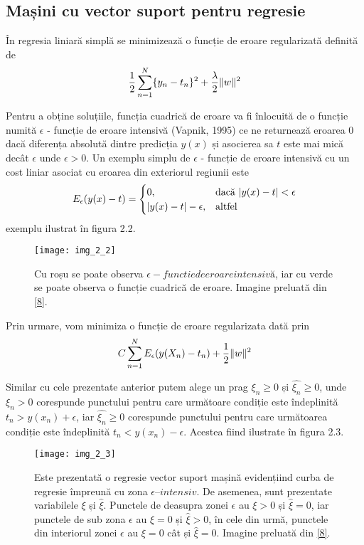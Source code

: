 \subsection{Mașini cu vector suport pentru regresie}

În regresia liniară simplă se minimizează o funcție de eroare regularizată definită de
\begin{align}
	\frac{1}{2}\sum_{n=1}^{N}\{y_n-t_n\}^2+\frac{\lambda}{2}\lVert w\rVert^2
\end{align}

Pentru a obține soluțiile, funcția cuadrică de eroare va fi înlocuită de o funcție numită $\epsilon$ - funcție de eroare intensivă (Vapnik, 1995) ce ne returnează eroarea 0 dacă diferența absolută dintre predicția $y(x)$ și asocierea sa $t$ este mai mică decât $\epsilon$ unde $\epsilon > 0$. Un exemplu simplu de $\epsilon$ - funcție de eroare intensivă cu un cost liniar asociat cu eroarea din exteriorul regiunii este
\begin{align}
	E_{\epsilon}(y(x) - t) = 
	\begin{cases}
	0,& \text{dacă } \lvert y(x) - t\rvert < \epsilon\\
	\lvert y(x) - t\rvert - \epsilon,              & \text{altfel}
	\end{cases}
\end{align}
exemplu ilustrat în figura 2.2.
\begin{figure}[!h]
	\centering
	\texttt{[image: img\_2\_2]}
	\caption[Mașini cu vector suport pentru regresie]{Cu roșu se poate observa $\epsilon - functie de eroare intensivă$, iar cu verde se poate observa o funcție cuadrică de eroare. Imagine preluată din \hyperlink{ChristopherBishop}{[8]}.}
\end{figure}
 
Prin urmare, vom minimiza o funcție de eroare regularizata dată prin
\begin{align}	
	C\sum_{n = 1}^{N}E_{\epsilon}(y(X_n) - t_n) + \frac{1}{2}\lVert w\rVert ^ 2
\end{align}

Similar cu cele prezentate anterior putem alege un prag $\xi_n \geq 0$ și $ \widehat{\xi_n} \geq 0$, unde $\xi_n > 0$ corespunde punctului pentru care următoare condiție este îndeplinită $t_n > y(x_n) + \epsilon$, iar  $ \widehat{\xi_n} \geq 0$ corespunde punctului pentru care următoarea condiție este îndeplinită $t_n < y(x_n) - \epsilon$. Acestea fiind ilustrate în figura 2.3.
\begin{figure}[!h]
	\centering
	\texttt{[image: img\_2\_3]}
	\caption[Mașini cu vector suport pentru regresie 2]{Este prezentată o regresie vector suport mașină evidențiind curba de regresie împreună cu zona $\epsilon – intensiv$. De asemenea, sunt prezentate variabilele $\xi$ și $ \widehat{\xi}$. Punctele de deasupra zonei $\epsilon$ au $\xi > 0$ și $ \widehat{\xi} = 0$, iar punctele de sub zona $\epsilon$ au $\xi = 0$ și $ \widehat{\xi} > 0$, în cele din urmă, punctele din interiorul zonei $\epsilon$ au $\xi = 0$ cât și $ \widehat{\xi} = 0$. Imagine preluată din \hyperlink{ChristopherBishop}{[8]}.}
\end{figure}

